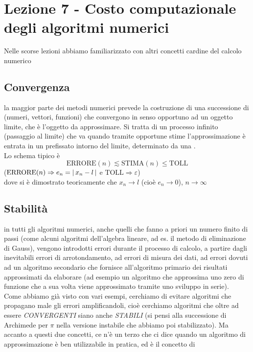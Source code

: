 \section{Lezione 7 - Costo computazionale degli algoritmi numerici}
Nelle scorse lezioni abbiamo familiarizzato con altri concetti cardine del calcolo numerico 

\subsection{Convergenza}
la maggior parte dei metodi numerici prevede la costruzione di una successione di  (numeri, vettori, funzioni) che convergono in senso opportuno ad un oggetto limite, che è l'oggetto da approssimare. Si tratta di un processo infinito (passaggio al limite) che va  quando tramite opportune stime l'approssimazione è entrata in un prefissato intorno del limite, determinato da una .\\
Lo schema tipico è 
\[ \text{ERRORE}(n) \lesssim \text{STIMA}(n) \le \text{TOLL} \]
($\text{ERRORE}(n) \Rightarrow e_n = \lvert\,x_n-l\,\rvert$ e $\text{TOLL} \Rightarrow\varepsilon$)\\
dove si è dimostrato teoricamente che $x_n\to l$ (cioè $e_n\to0$), $n\to\infty$ 

\subsection{Stabilità}
in tutti gli algoritmi numerici, anche quelli che fanno a priori un numero finito di passi (come alcuni algoritmi dell'algebra lineare, ad es. il metodo di eliminazione di Gauss), vengono introdotti errori durante il processo di calcolo, a partire dagli inevitabili errori di arrotondamento, ad errori di misura dei dati, ad errori dovuti ad un algoritmo secondario che fornisce all'algoritmo primario dei risultati approssimati da elaborare (ad esempio un algoritmo che approssima uno zero di funzione che a sua volta viene approssimato tramite uno sviluppo in serie).\\
Come abbiamo già visto con vari esempi, cerchiamo di evitare algoritmi che propagano male gli errori amplificandoli, cioè cerchiamo algoritmi che oltre ad essere \textit{CONVERGENTI} siano anche \textit{STABILI} (si pensi alla successione di Archimede per $\pi$ nella versione instabile che abbiamo poi stabilizzato).
\newline \newline
Ma accanto a questi due concetti, ce n'è un terzo che ci dice quando un algoritmo di approssimazione è ben utilizzabile in pratica, ed è il concetto di

